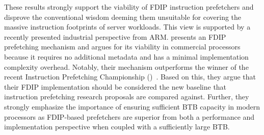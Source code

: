 \documentclass[../main.tex]{subfiles}
\begin{document}
\begin{refsection}
These results strongly support the viability of FDIP instruction
prefetchers and disprove the conventional wisdom deeming them
unsuitable for covering the massive instruction footprints of server
workloads. This view is supported by a recently presented industrial
perspective from ARM. \textcite{ishii21_re_fetch_direc_instr_prefet}
presents an FDIP prefetching mechanism and argues for its viability in
commercial processors because it requires no additional metadata and
has a minimal implementation complexity overhead. Notably, their
mechanism outperforms the winner of the recent Instruction Prefetching
Championship ()~\cite{ipc1}. Based on this, they argue that their
FDIP implementation should be considered the new baseline that
instruction prefetching research proposals are compared
against. Further, they strongly emphasize the importance of ensuring
sufficient BTB capacity in modern processors as FDIP-based prefetchers
are superior from both a performance and implementation perspective
when coupled with a sufficiently large BTB.














\ifx\chapincluded\undefined
  \printbibliography
  \end{refsection}
 \fi
\end{document}
